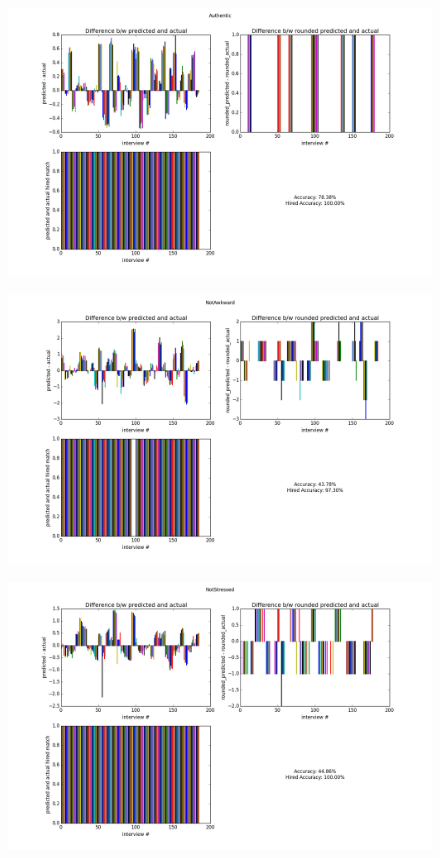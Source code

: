 \documentclass[11pt]{article}
\begin{document}
\begin{figure}[H]
\begin{center}
\includegraphics[width=1\columnwidth]{figures2/Authentic.png}
\end{center}
\end{figure}

\begin{figure}[H]
\begin{center}
\includegraphics[width=1\columnwidth]{figures2/NotAwkward.png}
\end{center}
\end{figure}

\begin{figure}[H]
\begin{center}
\includegraphics[width=1\columnwidth]{figures2/NotStressed.png}
\end{center}
\end{figure}
\end{document}
